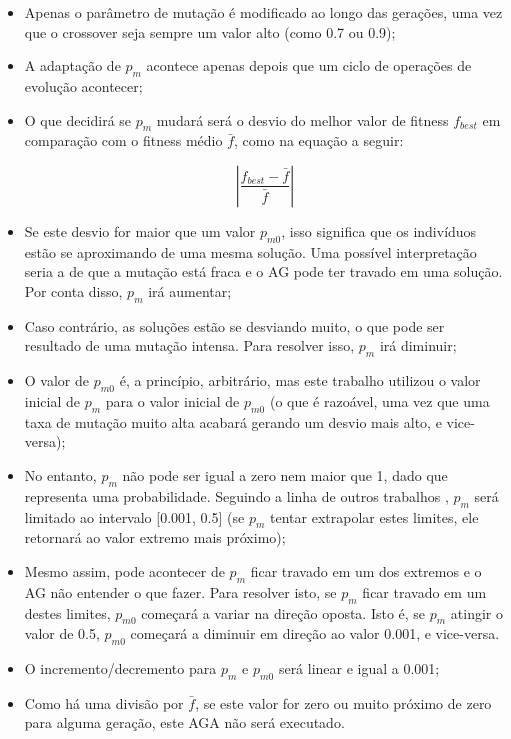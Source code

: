 \begin{itemize}

	\item Apenas o parâmetro de mutação é modificado ao longo das gerações, uma vez que o crossover seja sempre um valor alto (como 0.7 ou 0.9);

	\item A adaptação de $p_m$ acontece apenas depois que um ciclo de operações de evolução acontecer;

	\item O que decidirá se $p_m$ mudará será o desvio do melhor valor de fitness $f_{best}$ em comparação com o fitness médio $\bar{f}$, como na equação a seguir:

\begin{equation}
	\left| \frac{f_{best} - \bar{f}}{\bar{f}} \right|
\label{eq:aga}
\end{equation}

	\item Se este desvio for maior que um valor $p_{m0}$, isso significa que os indivíduos estão se aproximando de uma mesma solução. Uma possível interpretação seria a de que a mutação está fraca e o AG pode ter travado em uma solução. Por conta disso, $p_m$ irá aumentar;

	\item Caso contrário, as soluções estão se desviando muito, o que pode ser resultado de uma mutação intensa. Para resolver isso, $p_m$ irá diminuir;

	\item O valor de $p_{m0}$ é, a princípio, arbitrário, mas este trabalho utilizou o valor inicial de $p_m$ para o valor inicial de $p_{m0}$ (o que é razoável, uma vez que uma taxa de mutação muito alta acabará gerando um desvio mais alto, e vice-versa);

	\item No entanto, $p_m$ não pode ser igual a zero nem maior que 1, dado que representa uma probabilidade. Seguindo a linha de outros trabalhos \cite{matthias2013variable}, $p_m$ será limitado ao intervalo [0.001, 0.5] (se $p_m$ tentar extrapolar estes limites, ele retornará ao valor extremo mais próximo);
	
	\item Mesmo assim, pode acontecer de $p_m$ ficar travado em um dos extremos e o AG não entender o que fazer. Para resolver isto, se $p_m$ ficar travado em um destes limites, $p_{m0}$ começará a variar na direção oposta. Isto é, se $p_m$ atingir o valor de 0.5, $p_{m0}$ começará a diminuir em direção ao valor 0.001, e vice-versa.

	\item O incremento/decremento para $p_m$ e $p_{m0}$ será linear e igual a 0.001;
	
	\item Como há uma divisão por $\bar{f}$, se este valor for zero ou muito próximo de zero para alguma geração, este AGA não será executado.

\end{itemize}

